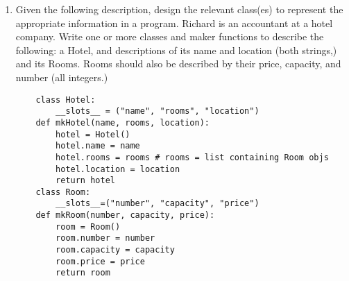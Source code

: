 \documentclass[11pt]{article}
\newenvironment{answer}{\large\lstset{basicstyle=\tiny\ttfamily}\color{white}}{}
\newenvironment{answer}{\large\lstset{basicstyle=\large\ttfamily}\color{red}}{}
\begin{document}
\begin{enumerate}
\begin{enumerate}
\begin{answer}
        \end{answer}

    \item Draw the table of the properly behaving hash function.
        
        \begin{answer}
		\begin{lstlisting}[numbers=none]
[['wrestled', 'bear', 'once'], ['I', 'a'], [], []]
		\end{lstlisting}
    \end{answer}
\item Assuming that this hash table will only be used on strings, is the hashing function being used a good one? Why or why not?

    \begin{answer}
        No: It ignores the fact that most English words are the roughly the same length. The number of collisions is expected to be massive. We should take advantage of the characters in the input strings, not the number of characters.
    \end{answer}
    \end{enumerate}

\section*{Classes}

\item 
Given the following description, design the relevant class(es) to represent the appropriate information in a program. Richard is an accountant at a hotel company. Write one or more classes and maker functions to describe the following: a Hotel, and descriptions of its name and location (both strings,) and its Rooms. Rooms should also be described by their price, capacity, and number (all integers.)

	\small
	\begin{answer}
	\begin{lstlisting}
	class Hotel:
		__slots__ = ("name", "rooms", "location")
	def mkHotel(name, rooms, location):
		hotel = Hotel()
		hotel.name = name
		hotel.rooms = rooms # rooms = list containing Room objs
		hotel.location = location
		return hotel
	class Room:
		__slots__=("number", "capacity", "price")
	def mkRoom(number, capacity, price):
		room = Room()
		room.number = number
		room.capacity = capacity
		room.price = price
		return room
	\end{lstlisting}
	\end{answer}
	\normalsize
	

\end{enumerate}
\end{document}

